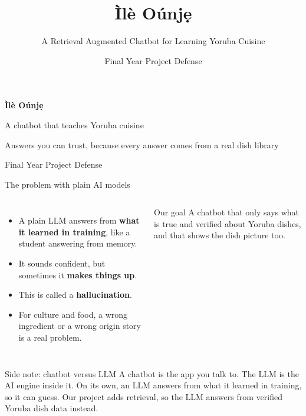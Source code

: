 \documentclass[aspectratio=169,11pt]{beamer}
\title{Ìlè Oúnjẹ}
\subtitle{A Retrieval Augmented Chatbot for Learning Yoruba Cuisine}
\author{Final Year Project Defense}
\date{}
\newcommand{\key}[1]{\textcolor{ember}{\textbf{#1}}}
\begin{document}
\begin{frame}[plain]
  \centering
  \vspace{1.3cm}
  {\fontsize{38}{44}\selectfont\bfseries\color{white} Ìlè Oúnjẹ\par}
  \vspace{0.4cm}
  {\Large\color{ember} A chatbot that teaches Yoruba cuisine\par}
  \vspace{0.5cm}
  {\normalsize\color{white} Answers you can trust, because every answer comes from a real dish library\par}
  \vspace{1.2cm}
  {\small\color{white!80} Final Year Project Defense\par}
\end{frame}

\begin{frame}{The problem with plain AI models}
  \begin{columns}[T]
      \begin{itemize}
        \item A plain LLM answers from \key{what it learned in training}, like a student answering from memory.
        \item It sounds confident, but sometimes it \key{makes things up}.
        \item This is called a \key{hallucination}.
        \item For culture and food, a wrong ingredient or a wrong origin story is a real problem.
      \end{itemize}
      \begin{block}{Our goal}
        A chatbot that only says what is \alert{true and verified} about Yoruba dishes, and that shows the dish picture too.
      \end{block}
  \end{columns}
  \vfill
  \begin{block}{Side note: chatbot versus LLM}
    \footnotesize
    A chatbot is the app you talk to. The LLM is the AI engine inside it. On its own, an LLM answers from what it learned in training, so it can guess. Our project adds retrieval, so the LLM answers from \alert{verified Yoruba dish data} instead.
  \end{block}
\end{frame}
\end{document}
